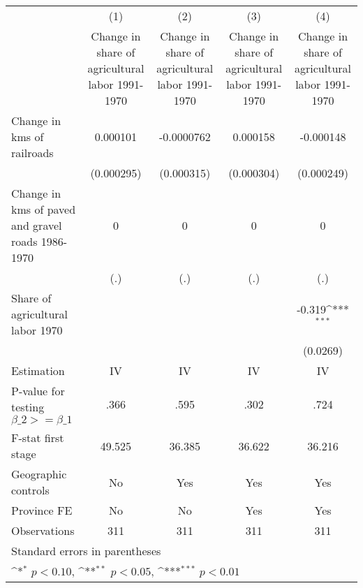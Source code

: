 {
\def\sym#1{\ifmmode^{#1}\else\(^{#1}\)\fi}
\begin{tabular}{l*{4}{c}}
\hline\hline
                &\multicolumn{1}{c}{(1)}&\multicolumn{1}{c}{(2)}&\multicolumn{1}{c}{(3)}&\multicolumn{1}{c}{(4)}\\
                &\multicolumn{1}{c}{Change in share of agricultural labor 1991-1970}&\multicolumn{1}{c}{Change in share of agricultural labor 1991-1970}&\multicolumn{1}{c}{Change in share of agricultural labor 1991-1970}&\multicolumn{1}{c}{Change in share of agricultural labor 1991-1970}\\
\hline
Change in kms of railroads& 0.000101         &-0.0000762         & 0.000158         &-0.000148         \\
                &(0.000295)         &(0.000315)         &(0.000304)         &(0.000249)         \\
[1em]
Change in kms of paved and gravel roads 1986-1970&        0         &        0         &        0         &        0         \\
                &      (.)         &      (.)         &      (.)         &      (.)         \\
[1em]
Share of agricultural labor 1970&                  &                  &                  &   -0.319\sym{***}\\
                &                  &                  &                  & (0.0269)         \\
\hline
Estimation      &       IV         &       IV         &       IV         &       IV         \\
P-value for testing $\beta\_2 >= \beta\_1$&     .366         &     .595         &     .302         &     .724         \\
F-stat first stage&   49.525         &   36.385         &   36.622         &   36.216         \\
Geographic controls&       No         &      Yes         &      Yes         &      Yes         \\
Province FE     &       No         &       No         &      Yes         &      Yes         \\
Observations    &      311         &      311         &      311         &      311         \\
\hline\hline
\multicolumn{5}{l}{\footnotesize Standard errors in parentheses}\\
\multicolumn{5}{l}{\footnotesize \sym{*} \(p<0.10\), \sym{**} \(p<0.05\), \sym{***} \(p<0.01\)}\\
\end{tabular}
}
